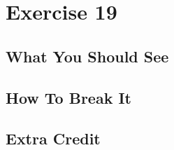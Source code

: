 \chapter{Exercise 19}


\section{What You Should See}


\section{How To Break It}


\section{Extra Credit}



